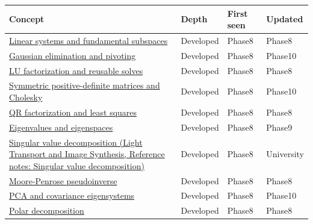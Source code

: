 {\def\LTcaptype{none} %
\begin{longtable}[]{@{}
  >{\raggedright\arraybackslash}p{}
  >{\raggedright\arraybackslash}p{}
  >{\raggedright\arraybackslash}p{}
  >{\raggedright\arraybackslash}p{}@{}}
\toprule\noalign{}
\begin{minipage}[b]{\linewidth}\raggedright
Concept
\end{minipage} & \begin{minipage}[b]{\linewidth}\raggedright
Depth
\end{minipage} & \begin{minipage}[b]{\linewidth}\raggedright
First seen
\end{minipage} & \begin{minipage}[b]{\linewidth}\raggedright
Updated
\end{minipage} \\
\midrule\noalign{}
\endhead
\bottomrule\noalign{}
\endlastfoot
\hyperref[appendix-8572a4a060c1]{Linear systems and fundamental subspaces} & Developed & Phase8 & Phase8 \\
\hyperref[appendix-f6e77f4a200f]{Gaussian elimination and pivoting} & Developed & Phase8 & Phase10 \\
\hyperref[appendix-55e4b5b0a1e6]{LU factorization and reusable solves} & Developed & Phase8 & Phase8 \\
\hyperref[appendix-50d2ea3c9b26]{Symmetric positive-definite matrices and Cholesky} & Developed & Phase8 & Phase10 \\
\hyperref[appendix-c3421e6b4f2c]{QR factorization and least squares} & Developed & Phase8 & Phase8 \\
\hyperref[appendix-0b3be18411f9]{Eigenvalues and eigenspaces} & Developed & Phase8 & Phase9 \\
\href{../04-Light-Transport-and-Image-Synthesis/main.pdf\#nameddest=appendix-1fad5e7f36fa}{Singular value decomposition (Light Transport and Image Synthesis, Reference notes: Singular value decomposition)} & Developed & Phase8 & University \\
\hyperref[appendix-541306fdbc1b]{Moore-Penrose pseudoinverse} & Developed & Phase8 & Phase8 \\
\hyperref[appendix-ad175ef3c5bf]{PCA and covariance eigensystems} & Developed & Phase8 & Phase10 \\
\hyperref[appendix-73f5bcf7a462]{Polar decomposition} & Developed & Phase8 & Phase8 \\

\end{longtable}}
